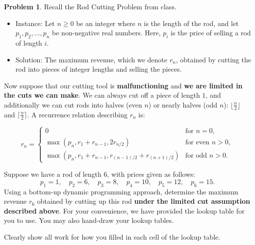 \documentclass[11pt]{article}
\theoremstyle{definition}
\theoremstyle{definition}
\newtheorem{required}{Problem}
\theoremstyle{definition}
\begin{document}
\begin{required} \label{Problem2}
Recall the \textsf{Rod Cutting Problem} from class. 
\begin{itemize}
\item \textsf{Instance:} Let $n \geq 0$ be an integer where $n$ is the length of the rod, and let $p_{1}, p_{2}, \ldots, p_{n}$ be non-negative real numbers. Here, $p_{i}$ is the price of selling a rod of length $i$.
\item \textsf{Solution:} The maximum revenue, which we denote $r_{n}$, obtained by cutting the rod into pieces of integer lengths and selling the pieces.
\end{itemize}

\noindent Now suppose that our cutting tool is \textbf{malfunctioning} and \textbf{we are limited in the cuts we can make}.  We can always cut off a piece of length $1$, and additionally we can cut rods into halves (even $n$) or nearly halves (odd $n$): $\lfloor\frac{n}{2}\rfloor$ and $\lceil\frac{n}{2}\rceil$.  A recurrence relation describing $r_n$ is:

\[
r_{n} =
\begin{cases} 
	0 & \text{for } n=0,\\
	\max(p_n, r_1 + r_{n-1}, 2r_{n/2}) & \text{for even } n > 0, \\
        \max(p_n, r_1 + r_{n-1}, r_{(n-1)/2} + r_{(n+1)/2}) & \text{for odd } n > 0.
\end{cases}
\]

Suppose we have a rod of length $6$, with prices given as follows:
\[ p_{1} = 1, \quad p_{2} = 6, \quad p_{3} = 8, \quad p_{4} = 10, \quad p_{5} = 12, \quad p_{6} = 15. \] 
Using a bottom-up dynamic programming approach, determine the maximum revenue $r_{6}$ obtained by cutting up this rod \textbf{under the limited cut assumption described above}. For your convenience, we have provided the lookup table for you to use. You may also hand-draw your lookup tables. 

\noindent Clearly show all work for how you filled in each cell of the lookup table.

\end{required}
\end{document}
